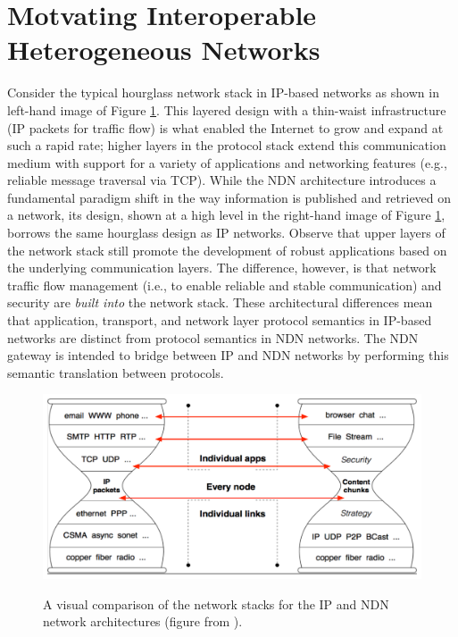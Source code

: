 \section{Motvating Interoperable Heterogeneous Networks}
Consider the typical hourglass network stack in IP-based networks as shown in left-hand image of Figure \ref{fig:hourglass}. This layered design with a thin-waist infrastructure (IP packets for traffic flow) is what enabled the Internet to grow and expand at such a rapid rate; higher layers in the protocol stack extend this communication medium with support for a variety of applications and networking features (e.g., reliable message traversal via TCP). While the NDN architecture introduces a fundamental paradigm shift in the way information is published and retrieved on a network, its design, shown at a high level in the right-hand image of Figure \ref{fig:hourglass}, borrows the same hourglass design as IP networks. Observe that upper layers of the network stack still promote the development of robust applications based on the underlying communication layers. The difference, however, is that network traffic flow management (i.e., to enable reliable and stable communication) and security are \emph{built into} the network stack. These architectural differences mean that application, transport, and network layer protocol semantics in IP-based networks are distinct from protocol semantics in NDN networks. The NDN gateway is intended to bridge between IP and NDN networks by performing this semantic translation between protocols. 

\begin{figure}[ht!]
\begin{center}
\includegraphics[scale=0.32]{./images/hourglass_conn.pdf}
\label{fig:hourglass}
\caption{A visual comparison of the network stacks for the IP and NDN network architectures (figure from \cite{ndn-techreport}).}
\end{center}
\end{figure}


